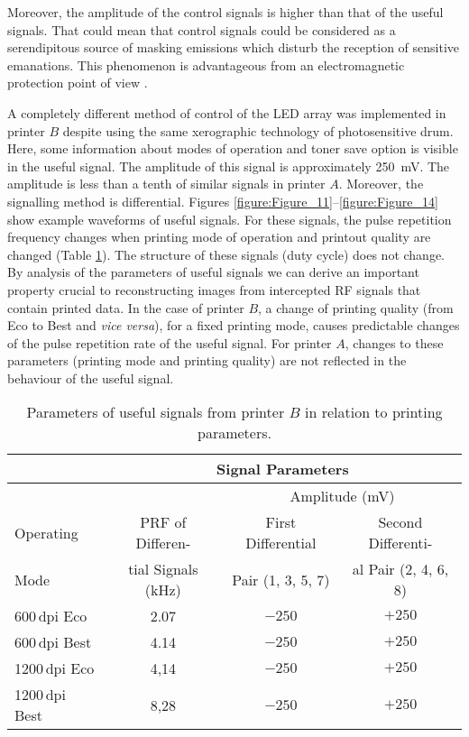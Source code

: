 \documentclass[12pt,a4paper]{article}
\begin{document}
Moreover, the amplitude of the control signals is higher than that of the
useful signals. That could mean that control signals could be considered as a
serendipitous source of masking emissions which disturb the reception of
sensitive emanations. This phenomenon is advantageous from an electromagnetic
protection point of view \cite{Ulas2016a,Guerrieri2018a,Loughry2002a}.

A completely different method of control of the LED array was implemented in
printer $B$ despite using the same xerographic technology of photosensitive
drum. Here, some information about modes of operation and toner save option is
visible in the useful signal. The amplitude of this signal is approximately
\SI{250}{\milli\volt}. The amplitude is less than a tenth of similar signals
in printer $A$. Moreover, the signalling method is differential.
Figures \ref{figure:Figure_11}--\ref{figure:Figure_14} show example waveforms
of useful signals. For these signals, the pulse repetition frequency changes
when printing mode of operation and printout quality are changed (Table
\ref{table:Table_2}). The structure of these signals (duty cycle) does not
change. By analysis of the parameters of useful signals we can derive an
important property crucial to reconstructing images from intercepted RF
signals that contain printed data. In the case of printer $B$, a change of
printing quality (from Eco to Best and {\it vice versa}), for a fixed
printing mode, causes predictable changes of the pulse repetition rate of the
useful signal. For printer $A$, changes to these parameters (printing mode
and printing quality) are not reflected in the behaviour of the useful
signal.

\begin{table}[!t]
    \centering
    \begin{tabular}{|l|c|c|c|}
        \hline
        & \multicolumn{3}{c|}{Signal Parameters} \\
        \hline
        & & \multicolumn{2}{c|}{Amplitude (\si{\milli\volt})} \\
        \hline
        Operating & PRF of Differen-
            & First Differential & Second Differenti- \\
        Mode & tial Signals (\si{\kilo\hertz})
            & Pair (1, 3, 5, 7) & al Pair (2, 4, 6, 8) \\
        \hline
        600\,dpi Eco   & 2.07 & $-250$ & $+250$ \\
        600\,dpi Best  & 4.14 & $-250$ & $+250$ \\
        1200\,dpi Eco  & 4,14 & $-250$ & $+250$ \\
        1200\,dpi Best & 8,28 & $-250$ & $+250$ \\
        \hline
    \end{tabular}
    \caption{Parameters of useful signals from printer $B$ in relation to
        printing parameters.}
    \label{table:Table_2}
\end{table}
\end{document}
